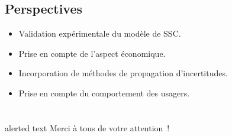 \documentclass[xcolor=x11names, compress, 11pt]{beamer}
\newcommand{\addalert}[1]{%
\begin{beamercolorbox}[sep=2pt,center,shadow=true,rounded=true]{alerted text}
    #1\par%
\end{beamercolorbox}%
}
\begin{document}
\subsection{Perspectives}
\begin{frame}[c]
    \vfill
    \begin{itemize}
        \item Validation expérimentale du modèle de SSC.
    \vfill
        \item<2-> Prise en compte de l’aspect économique.
    \vfill
        \item<3-> Incorporation de méthodes de propagation d’incertitudes.
    \vfill
        \item<4-> Prise en compte du comportement des usagers.
    \end{itemize}
    \vfill
\end{frame}



\section*{}
\begin{frame}[plain, c]
    \vfill
    \addalert{Merci à tous de votre attention~!}
    \vfill
\end{frame}









\end{document}
